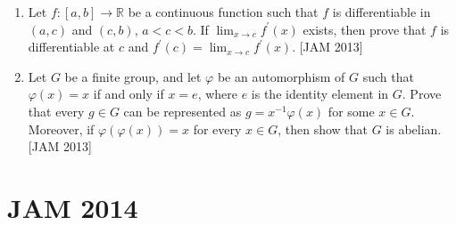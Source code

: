 \begin{enumerate}
\item  Let $f:[a, b] \rightarrow \mathbb{R}$ be a continuous function such that $f$ is differentiable in $(a, c)$ and $(c, b)$, $a<c<b$. If $\lim _{x \rightarrow c} f^{\prime}(x)$ exists, then prove that $f$ is differentiable at $c$ and $f^{\prime}(c)=\lim _{x \rightarrow c} f^{\prime}(x)$.
\hfill [JAM 2013]



\item  Let $G$ be a finite group, and let $\varphi$ be an automorphism of $G$ such that $\varphi(x)=x$ if and only if $x=e$, where $e$ is the identity element in $G$. Prove that every $g \in G$ can be represented as $g=x^{-1} \varphi(x)$ for some $x \in G$. Moreover, if $\varphi(\varphi(x))=x$ for every $x \in G$, then show that $G$ is abelian.
\hfill [JAM 2013]




    
\end{enumerate}
\newpage
\section{JAM 2014}

